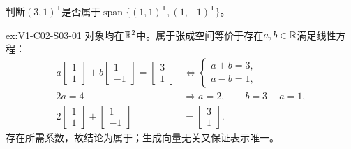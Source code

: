 \begin{SLChapterExercisePairSection}
\begin{exercise}[张成判断]\label{ex:V1-C02-S03-01}
判断$(3,1)^{\mathsf T}$是否属于$\operatorname{span}\{(1,1)^{\mathsf T},(1,-1)^{\mathsf T}\}$。
\end{exercise}
\label{sol:V1-C02-S03-01}
\begin{chapterexercisesolution}{ex:V1-C02-S03-01}
对象均在$\mathbb{R}^2$中。属于张成空间等价于存在$a,b\in\mathbb{R}$满足线性方程：
\[
\begin{aligned}
a\begin{bmatrix}1\\1\end{bmatrix}
+b\begin{bmatrix}1\\-1\end{bmatrix}
=\begin{bmatrix}3\\1\end{bmatrix}
&\Longleftrightarrow
\begin{cases}a+b=3,\\a-b=1,\end{cases}\\
2a=4&\Longrightarrow a=2,
\qquad b=3-a=1,\\
2\begin{bmatrix}1\\1\end{bmatrix}
+\begin{bmatrix}1\\-1\end{bmatrix}
&=\begin{bmatrix}3\\1\end{bmatrix}.
\end{aligned}
\]
存在所需系数，故结论为属于；生成向量无关又保证表示唯一。
\end{chapterexercisesolution}


\end{SLChapterExercisePairSection}
